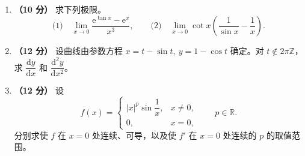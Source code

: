 \documentclass[UTF8,a4paper,zihao=-4,fontset=fandol]{ctexart}
\begin{document}
\begin{enumerate}[start=17]
  \item \textbf{（10 分）} 求下列极限。
  \[
    \text{(1)}\quad\lim_{x\to0}\frac{\mathrm{e}^{\tan x}-\mathrm{e}^{x}}{x^3},
    \qquad
    \text{(2)}\quad\lim_{x\to0}\cot x\left(\frac{1}{\sin x}-\frac{1}{x}\right).
  \]
  \vspace{5.5cm}

  \item \textbf{（12 分）} 设曲线由参数方程
  $x=t-\sin t,\ y=1-\cos t$ 确定。对 $t\notin2\pi\mathbb{Z}$，
  求 $\dfrac{\mathrm{d}y}{\mathrm{d}x}$ 和 $\dfrac{\mathrm{d}^2y}{\mathrm{d}x^2}$。
  \vspace{5.5cm}

  \item \textbf{（12 分）} 设
  \[
    f(x)=
    \begin{cases}
      |x|^p\sin\dfrac{1}{x}, & x\ne0,\\
      0, & x=0,
    \end{cases}
    \qquad p\in\mathbb{R}.
  \]
  分别求使 $f$ 在 $x=0$ 处连续、可导，以及使 $f'$ 在 $x=0$ 处连续的 $p$ 的取值范围。
\end{enumerate}
\end{document}
